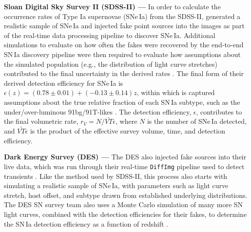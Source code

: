 \documentclass[DM,lsstdraft,toc]{lsstdoc}
\begin{document}
{\bf Sloan Digital Sky Survey II (SDSS-II) ---} In order to calculate the occurrence rates of Type Ia supernovae (SNe\,Ia) from the SDSS-II, \cite{2008AJ....135..348S} generated a realistic sample of SNe\,Ia and injected fake point sources into the images as part of the real-time data processing pipeline to discover SNe\,Ia. Additional simulations to evaluate on how often the fakes were recovered by the end-to-end SN\,Ia discovery pipeline were then required to evaluate how assumptions about the simulated population (e.g., the distribution of light curve stretches) contributed to the final uncertainty in the derived rates \citep{2008ApJ...682..262D}. The final form of their derived detection efficiency for SNe\,Ia is $\epsilon(z) = (0.78 \pm 0.01) + (-0.13 \pm 0.14)z$, within which is captured assumptions about the true relative fraction of each SN\,Ia subtype, such as the under/over-luminous 91bg/91T-likes \citep{2008ApJ...682..262D}. The detection efficiency, $\epsilon$, contributes to the final volumetric rate, $r_V = N / \widetilde{VT\epsilon}$, where $N$ is the number of SNe\,Ia detected, and $\widetilde{VT\epsilon}$ is the product of the effective survey volume, time, and detection efficiency.

{\bf Dark Energy Survey (DES) ---} The DES also injected fake sources into their live data, which was run through their real-time {\tt DiffImg} pipeline used to detect transients \cite{2015AJ....150..172K}. Like the method used by SDSS-II, this process also starts with simulating a realistic sample of SNe\,Ia, with parameters such as light curve stretch, host offset, and subtype drawn from established underlying distributions. The DES SN survey team also uses a Monte Carlo simulation of many more SN light curves, combined with the detection efficiencies for their fakes, to determine the SN\,Ia detection efficiency as a function of redshift \cite{2015AJ....150..172K}.
\end{document}
